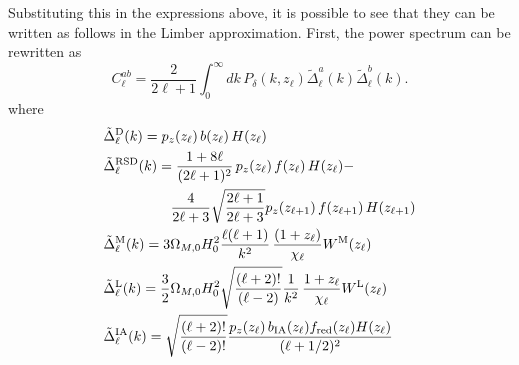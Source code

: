 \documentclass[\docopts]{\docclass}
\begin{document}
Substituting this in the expressions above, it is possible to see that they can be written as follows in the Limber approximation. First, the power spectrum can be rewritten as
\begin{equation}
 C^{ab}_\ell=\frac{2}{2\ell+1}\int_0^\infty dk\,P_\delta\left(k,z_\ell\right)
 \tilde{\Delta}^a_\ell(k)\tilde{\Delta}^b_\ell(k).
\end{equation}
where
\begin{align}
 &\tilde{\Delta}_\ell^{\rm D}(k)=p_z(z_\ell)\,b(z_\ell)\,H(z_\ell)\\
 &\tilde{\Delta}_\ell^{\rm RSD}(k)=
 \frac{1+8\ell}{(2\ell+1)^2}\,p_z(z_\ell)\,f(z_\ell)\,H(z_\ell)-\\
 &\hspace{48pt}\frac{4}{2\ell+3}\sqrt{\frac{2\ell+1}{2\ell+3}}p_z(z_{\ell+1})\,f(z_{\ell+1})\,H(z_{\ell+1})\\
 &\tilde{\Delta}_\ell^{\rm M}(k)=3\Omega_{M,0}H_0^2\frac{\ell(\ell+1)}{k^2}\,
 \frac{(1+z_\ell)}{\chi_\ell}W^{\rm M}(z_\ell)\\
 &\tilde{\Delta}_\ell^{\rm L}(k)=\frac{3}{2}\Omega_{M,0}H_0^2\sqrt{\frac{(\ell+2)!}{(\ell-2)}}\frac{1}{k^2}\,
 \frac{1+z_\ell}{\chi_\ell}W^{\rm L}(z_\ell)\\
 &\tilde{\Delta}_\ell^{\rm IA}(k)=\sqrt{\frac{(\ell+2)!}{(\ell-2)!}}\frac{p_z(z_\ell)\,b_{\rm IA}(z_\ell)f_{\rm red}(z_\ell)H(z_\ell)}{(\ell+1/2)^2}
\end{align}



%
%

\end{document}
